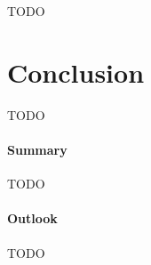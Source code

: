 \documentclass{PDS}
\begin{document}
TODO

\section{Conclusion}
\label{sec:conclusion}

TODO

\paragraph{Summary}

TODO

\paragraph{Outlook}

TODO

\begin{Backmatter}




\end{Backmatter}
\end{document}
